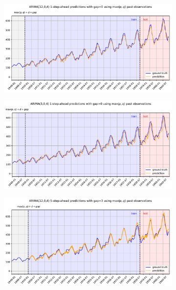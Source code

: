 \documentclass{article}
\begin{document}
\begin{figure}
  \centering
  \begin{subfigure}{\textwidth}
    \centering
    \includegraphics[scale=0.33]{figures/fig1}
    \caption{}
    \label{fig:f1}
  \end{subfigure}

  \begin{subfigure}{\textwidth}
    \centering
    \includegraphics[scale=0.33]{figures/fig2}
    \caption{}
    \label{fig:f2}
  \end{subfigure}

  \begin{subfigure}{\textwidth}
    \centering
    \includegraphics[scale=0.33]{figures/fig3}
    \caption{}
    \label{fig:f3}
  \end{subfigure}


\end{figure}
\end{document}
